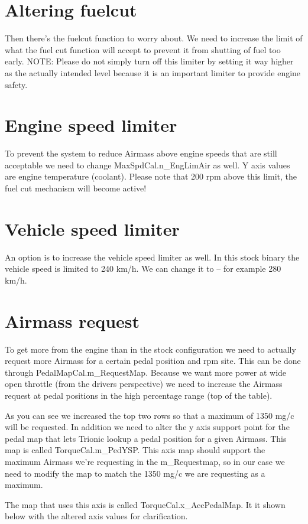 \documentclass[11pt,a4paper]{book}
\begin{document}
\section{Altering fuelcut}
Then there’s the fuelcut function to worry about. We need to increase the limit of what the fuel cut
function will accept to prevent it from shutting of fuel too early.
NOTE: Please do not simply turn off this limiter by setting it way higher as the actually intended level
because it is an important limiter to provide engine safety.


\section{Engine speed limiter}
To prevent the system to reduce Airmass above engine speeds that are still acceptable we need to
change MaxSpdCal.n\_EngLimAir as well. Y axis values are engine temperature (coolant). Please note
that 200 rpm above this limit, the fuel cut mechanism will become active!
\section{Vehicle speed limiter}
An option is to increase the vehicle speed limiter as well. In this stock binary the vehicle speed is
limited to 240 km/h. We can change it to – for example 280 km/h.


\section{Airmass request}
To get more from the engine than in the stock configuration we need to actually request more
Airmass for a certain pedal position and rpm site. This can be done through
PedalMapCal.m\_RequestMap. Because we want more power at wide open throttle (from the drivers
perspective) we need to increase the Airmass request at pedal positions in the high percentage range
(top of the table).

As you can see we increased the top two rows so that a maximum of 1350 mg/c will be requested.
In addition we need to alter the y axis support point for the pedal map that lets Trionic lookup a pedal
position for a given Airmass. This map is called TorqueCal.m\_PedYSP. This axis map should support
the maximum Airmass we’re requesting in the m\_Requestmap, so in our case we need to modify the
map to match the 1350 mg/c we are requesting as a maximum.

The map that uses this axis is called TorqueCal.x\_AccPedalMap. It it shown below with the altered
axis values for clarification.
\end{document}
